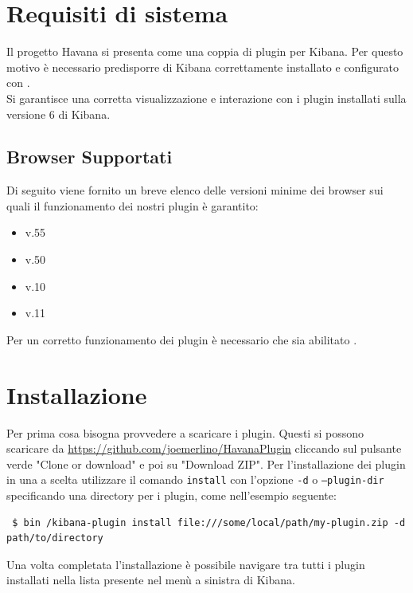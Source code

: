 \newpage
\section{Requisiti di sistema}
Il progetto Havana si presenta come una coppia di plugin per Kibana. Per questo motivo è necessario predisporre di Kibana correttamente installato e configurato con .
\\ Si garantisce una corretta visualizzazione e interazione con i plugin installati sulla versione 6 di Kibana.
\subsection{Browser Supportati}

Di seguito viene fornito un breve elenco delle versioni minime dei browser sui quali il funzionamento dei nostri plugin è garantito:
\begin{itemize}
	
	\item {} v.55
	\item {} v.50
	\item {} v.10
	\item {} v.11
	
\end{itemize}

Per un corretto funzionamento dei plugin è necessario che sia abilitato .


\section{Installazione}
Per prima cosa bisogna provvedere a scaricare i plugin. Questi si possono scaricare da \href{https://github.com/joemerlino/HavanaPlugin}{https://github.com/joemerlino/HavanaPlugin} cliccando sul pulsante verde "Clone or download" e poi su "Download ZIP".
Per l'installazione dei plugin in una  a scelta utilizzare il comando \texttt{install} con l'opzione \texttt{-d} o \texttt{--plugin-dir}  specificando una directory per i plugin, come nell'esempio seguente:
\begin{lstlisting}
 $ bin /kibana-plugin install file:///some/local/path/my-plugin.zip -d path/to/directory 
\end{lstlisting}

Una volta completata l'installazione è possibile navigare tra tutti i plugin installati nella lista presente nel menù a sinistra di Kibana.

